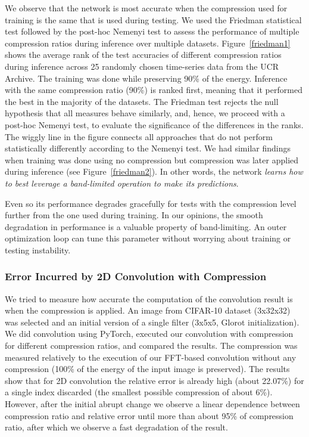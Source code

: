 We observe that the network is most accurate when the compression used for training is the same that is used during testing. We used the Friedman statistical test followed by the post-hoc Nemenyi test to assess the performance of multiple compression ratios during inference over multiple datasets. Figure~\ref{friedman1} shows the average rank of the test accuracies of different compression ratios during inference across 25 randomly chosen time-series data from the UCR Archive. The training was done while preserving 90\% of the energy. Inference with the same compression ratio (90\%) is ranked first, meaning that it performed the best in the majority of the datasets. The Friedman test rejects the null hypothesis that all measures behave similarly, and, hence, we proceed with a post-hoc Nemenyi test, to evaluate the significance of the differences in the ranks. The wiggly line in the figure connects all approaches that do not perform statistically differently according to the Nemenyi test. We had similar findings when training was done using no compression but compression was later applied during inference (see Figure~\ref{friedman2}). In other words, the network \emph{learns how to best leverage a band-limited operation to make its predictions}.
 
 Even so its performance degrades gracefully for tests with the compression level further from the one used during training. 
 In our opinions, the smooth degradation in performance is a valuable property of band-limiting. An outer optimization loop can tune this parameter without worrying about training or testing instability.

\subsubsection{Error Incurred by 2D Convolution with Compression}
We tried to measure how accurate the computation of the convolution result is when the compression is applied. An image from CIFAR-10 dataset (3x32x32) was selected and an initial version of a single filter (3x5x5, Glorot initialization). We did convolution using PyTorch, executed our convolution with compression for different compression ratios, and compared the results. The compression was measured relatively to the execution of our FFT-based convolution without any compression (100\% of the energy of the input image is preserved). The results show that for 2D convolution the relative error is already high (about 22.07\%) for a single index discarded (the smallest possible compression of about 6\%). However, after the initial abrupt change we observe a linear dependence between compression ratio and relative error until more than about 95\% of compression ratio, after which we observe a fast degradation of the result.

